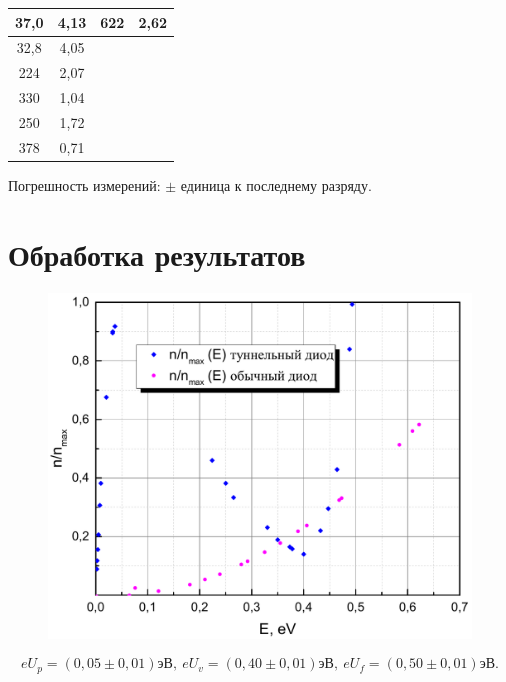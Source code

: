 \documentclass[a4paper,12pt]{article} %
\begin{document}
\begin{table}[H]
\begin{tabular}{|c|c|c|c|}
			37,0              & 4,13              & 622             & 2,62            \\ \hline
			32,8              & 4,05              &                 &                 \\ \hline
			224               & 2,07              &                 &                 \\ \hline
			330               & 1,04              &                 &                 \\ \hline
			250               & 1,72              &                 &                 \\ \hline
			378               & 0,71              &                 &                 \\ \hline
		\end{tabular}
	\end{table}
	Погрешность измерений: $\pm$ единица к последнему разряду.
	
	
	\newpage
	\section{Обработка результатов}
	\begin{figure}[h!]
		\begin{floatrow}
			{\includegraphics[scale=0.5]{graph.pdf}}    
		\end{floatrow}
	\end{figure}
	$$eU_p = (0,05 \pm 0,01)\text{эВ}, \ eU_v = (0,40 \pm 0,01)\text{эВ}, \ eU_f = (0,50 \pm 0,01) \text{эВ} . $$
\end{document}
